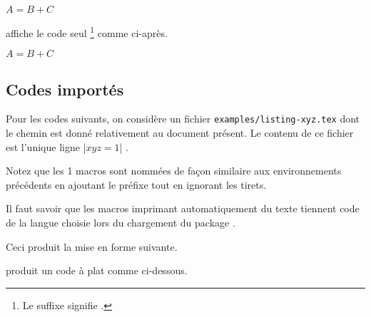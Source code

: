 \documentclass[12pt,a4paper]{article}
\begin{document}
\begin{doclatex-flat}
    $A = B + C$
\end{doclatex-flat}





 affiche le code seul
\footnote{
    Le suffixe  signifie .
}
comme ci-après.

\begin{doclatex-alone}
    $A = B + C$
\end{doclatex-alone}




\subsection{Codes importés}

Pour les codes suivants, on considère un fichier \verb+examples/listing-xyz.tex+ dont le chemin est donné relativement au document présent.
Le contenu de ce fichier est l'unique ligne \docilatex|$x y z = 1$| .

\medskip

Notez que les 1\ieres{} macros sont nommées de façon similaire aux environnements précédents en ajoutant le préfixe  tout en ignorant les tirets.


\begin{docrem}
	Il faut savoir que les macros imprimant automatiquement du texte tiennent code de la langue choisie lors du chargement du package .
\end{docrem}





\begin{doclatex-alone}
\end{doclatex-alone}

Ceci produit la mise en forme suivante.





\docexa[À la suite]

 produit un code à plat comme ci-dessous.

\end{document}
